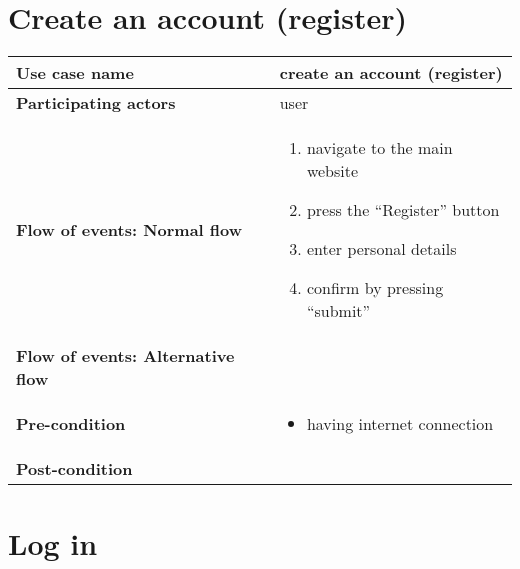 \documentclass[a4paper, 13pt, draft]{report}
\begin{document}
\section*{Create an account (register)}

\begin{center}
    \begin{tabular}{| >{\bf}l | p{5.55cm} |} 
	\hline
	Use case name & create an account (register) \\ 
	\hline
	Participating actors & user \\
	\hline
	Flow of events: Normal flow & 
	\begin{enumerate}		
	    \item navigate to the main website
	    \item press the ``Register'' button
	    \item enter personal details
	    \item confirm by pressing ``submit''
	\end{enumerate}	\\
	\hline
	Flow of events: Alternative flow & \notapplicable \\
	\hline
	Pre-condition & 
	\begin{itemize} 
	    \item having internet connection
	\end{itemize} \\
	\hline
	Post-condition & \notapplicable \\
	\hline
    \end{tabular}
\end{center}

\section*{Log in}
\end{document}
